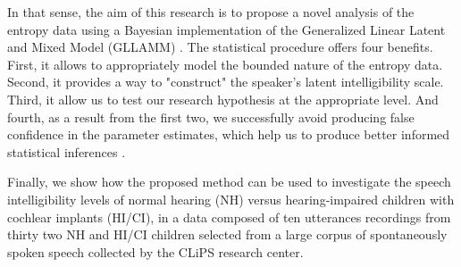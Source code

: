 \begin{comment}
	As it was suggested, several factors are proposed by the literature, but these can be largely grouped into three categories: audiology, child and environmental related factors. For the first, they are the chronological age, age at implantation, the duration of device use, `hearing' age, bilateral or contralateral cochlear implantation, and the children's preoperative and postoperative hearing levels. For the second, there is the etiology or the cause of the hearing impairment (e.g. genetic, infections), additional disabilities (e.g. mental retardation, speech motor problems), and gender. Finally for the last, there is the communication modality. 
	
	Therefore, considering the aforementioned variables, and the relation complexity with themselves and the outcome, we believe that a causal framework would allow us to integrate previous literature on the matter, and also provide a more transparent way of state and analyze our research hypothesis.
	
\end{comment}

In that sense, the aim of this research is to propose a novel analysis of the entropy data using a Bayesian implementation of the Generalized Linear Latent and Mixed Model (GLLAMM) \citep{Rabe_et_al_2004a, Rabe_et_al_2004b, Rabe_et_al_2004c, Rabe_et_al_2012, Skrondal_et_al_2004a}. The statistical procedure offers four benefits. First, it allows to appropriately model the bounded nature of the entropy data. Second, it provides a way to "construct" the speaker's latent intelligibility scale. Third, it allow us to test our research hypothesis at the appropriate level. And fourth, as a result from the first two, we successfully avoid producing false confidence in the parameter estimates, which help us to produce better informed statistical inferences \citep{McElreath_2020}.
	
Finally, we show how the proposed method can be used to investigate the speech intelligibility levels of normal hearing (NH) versus hearing-impaired children with cochlear implants (HI/CI), in a data composed of ten utterances recordings from thirty two NH and HI/CI children selected from a large corpus of spontaneously spoken speech collected by the CLiPS research center.

